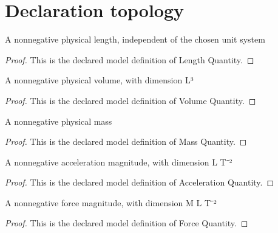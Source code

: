 \section{Declaration topology}
\begin{definition}
  \label{def:physics:phyx-mini-0447:phyxminiproblems-problemphyxmini0447-lengthquantity}
  A nonnegative physical length, independent of the chosen unit system
\end{definition}
\begin{proof}
  This is the declared model definition of Length Quantity.
\end{proof}
\begin{definition}
  \label{def:physics:phyx-mini-0447:phyxminiproblems-problemphyxmini0447-volumequantity}
  A nonnegative physical volume, with dimension L³
\end{definition}
\begin{proof}
  This is the declared model definition of Volume Quantity.
\end{proof}
\begin{definition}
  \label{def:physics:phyx-mini-0447:phyxminiproblems-problemphyxmini0447-massquantity}
  A nonnegative physical mass
\end{definition}
\begin{proof}
  This is the declared model definition of Mass Quantity.
\end{proof}
\begin{definition}
  \label{def:physics:phyx-mini-0447:phyxminiproblems-problemphyxmini0447-accelerationquantity}
  A nonnegative acceleration magnitude, with dimension L T⁻²
\end{definition}
\begin{proof}
  This is the declared model definition of Acceleration Quantity.
\end{proof}
\begin{definition}
  \label{def:physics:phyx-mini-0447:phyxminiproblems-problemphyxmini0447-forcequantity}
  A nonnegative force magnitude, with dimension M L T⁻²
\end{definition}
\begin{proof}
  This is the declared model definition of Force Quantity.
\end{proof}
